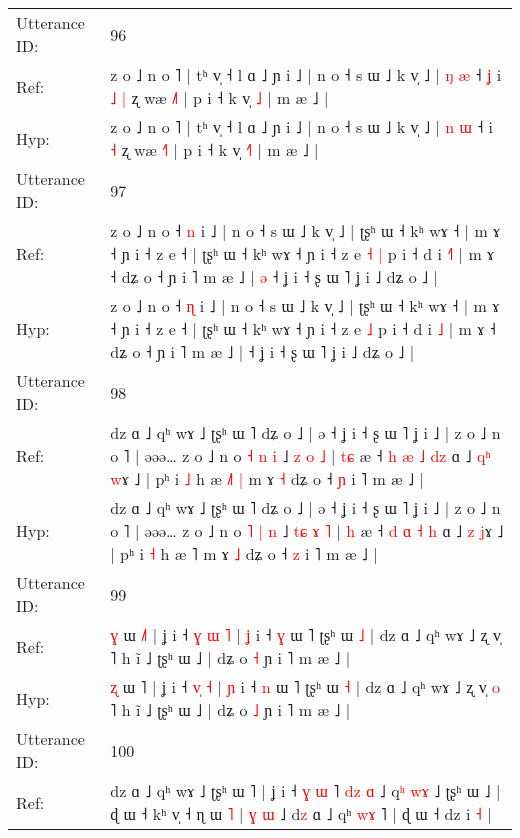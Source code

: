 \documentclass[10pt]{article}
\DeclareRobustCommand{\hl}[1]{{\textcolor{red}{#1}}}
\begin{document}
\begin{longtable}{ll}
 \\
\midrule
Utterance ID: & 96 \\
Ref: & z o ˩ n o ˥ | tʰ v̩ ˧ l ɑ ˩ ɲ i ˩ | n o ˧ s ɯ ˩ k v̩ ˩ | \hl{ŋ} \hl{æ} ˧\hl{ }\hl{ʝ} i\hl{ }\hl{˩} \hl{|} ʐ wæ \hl{˩}˥ | p i ˧ k v̩ \hl{}\hl{˩} | m æ ˩ |
 \\
Hyp: & z o ˩ n o ˥ | tʰ v̩ ˧ l ɑ ˩ ɲ i ˩ | n o ˧ s ɯ ˩ k v̩ ˩ | \hl{n} \hl{ɯ} ˧\hl{}\hl{} i\hl{}\hl{} \hl{˧} ʐ wæ \hl{˧}˥ | p i ˧ k v̩ \hl{˧}\hl{˥} | m æ ˩ |
 \\
\midrule
Utterance ID: & 97 \\
Ref: & z o ˩ n o ˧ \hl{n} i ˩ | n o ˧ s ɯ ˩ k v̩ ˩ | ʈʂʰ ɯ ˧ kʰ wɤ ˧ | m ɤ ˧ ɲ i ˧ z e ˧ | ʈʂʰ ɯ ˧ kʰ wɤ ˧ ɲ i ˧ z e\hl{ }\hl{˧} \hl{|} p i ˧ d i \hl{˧}\hl{˥} | m ɤ ˧ dʑ o ˧ ɲ i ˥ m æ ˩ |\hl{ }\hl{ə} ˧ ʝ i ˧ ʂ ɯ ˥ ʝ i ˩ dʑ o ˩ |
 \\
Hyp: & z o ˩ n o ˧ \hl{ɳ} i ˩ | n o ˧ s ɯ ˩ k v̩ ˩ | ʈʂʰ ɯ ˧ kʰ wɤ ˧ | m ɤ ˧ ɲ i ˧ z e ˧ | ʈʂʰ ɯ ˧ kʰ wɤ ˧ ɲ i ˧ z e\hl{}\hl{} \hl{˩} p i ˧ d i \hl{}\hl{˩} | m ɤ ˧ dʑ o ˧ ɲ i ˥ m æ ˩ |\hl{}\hl{} ˧ ʝ i ˧ ʂ ɯ ˥ ʝ i ˩ dʑ o ˩ |
 \\
\midrule
Utterance ID: & 98 \\
Ref: & dz ɑ ˩ qʰ wɤ ˩ ʈʂʰ ɯ ˥ dʑ o ˩ | ə ˧ ʝ i ˧ ʂ ɯ ˥ ʝ i ˩ | z o ˩ n o ˥ | əəə… z o ˩ n o \hl{˧} \hl{n} \hl{i} ˩ \hl{}\hl{z} \hl{o} \hl{˩} | \hl{t}\hl{ɕ} æ ˧ \hl{h} \hl{æ} \hl{˩} \hl{d}\hl{z} ɑ ˩ \hl{q}\hl{ʰ} \hl{w}ɤ ˩ | pʰ i \hl{˩} h æ \hl{˩}˥\hl{ }\hl{|} m ɤ \hl{˧} dʑ o ˧ \hl{ɲ} i ˥ m æ ˩ |
 \\
Hyp: & dz ɑ ˩ qʰ wɤ ˩ ʈʂʰ ɯ ˥ dʑ o ˩ | ə ˧ ʝ i ˧ ʂ ɯ ˥ ʝ i ˩ | z o ˩ n o ˥ | əəə… z o ˩ n o \hl{˥} \hl{|} \hl{n} ˩ \hl{t}\hl{ɕ} \hl{ɤ} \hl{˥} | \hl{}\hl{h} æ ˧ \hl{d} \hl{ɑ} \hl{˧} \hl{}\hl{h} ɑ ˩ \hl{}\hl{z} \hl{j}ɤ ˩ | pʰ i \hl{˧} h æ \hl{}˥\hl{}\hl{} m ɤ \hl{˩} dʑ o ˧ \hl{z} i ˥ m æ ˩ |
 \\
\midrule
Utterance ID: & 99 \\
Ref: & \hl{ɣ} ɯ \hl{˩}˥ | ʝ i ˧ \hl{ɣ}\hl{ }\hl{ɯ} \hl{˥} | \hl{ʝ} i ˧ \hl{ɣ} ɯ ˥ ʈʂʰ ɯ \hl{˩} | dz ɑ ˩ qʰ wɤ ˩ ʐ v̩\hl{}\hl{} ˥ h ĩ ˩ ʈʂʰ ɯ ˩ | dʑ o \hl{˧} ɲ i ˥ m æ ˩ |
 \\
Hyp: & \hl{ʐ} ɯ \hl{}˥ | ʝ i ˧ \hl{}\hl{v}\hl{̩} \hl{˧} | \hl{ɲ} i ˧ \hl{n} ɯ ˥ ʈʂʰ ɯ \hl{˧} | dz ɑ ˩ qʰ wɤ ˩ ʐ v̩\hl{ }\hl{o} ˥ h ĩ ˩ ʈʂʰ ɯ ˩ | dʑ o \hl{˩} ɲ i ˥ m æ ˩ |
 \\
\midrule
Utterance ID: & 100 \\
Ref: & dz ɑ ˩ qʰ wɤ ˩ ʈʂʰ ɯ ˥ | ʝ i ˧ \hl{ɣ} \hl{}\hl{ɯ} ˥ \hl{d}\hl{z} \hl{ɑ} ˩ q\hl{ʰ} \hl{w}\hl{ɤ} ˩ ʈʂʰ ɯ ˩ | ɖ ɯ ˧ kʰ v̩ ˧ ɳ ɯ \hl{˥} | \hl{ɣ}\hl{ }\hl{ɯ} ˩ d\hl{z} ɑ ˩ qʰ \hl{w}\hl{ɤ} ˥ | ɖ ɯ ˧ dz i \hl{˧} |

\end{longtable}
\end{document}
